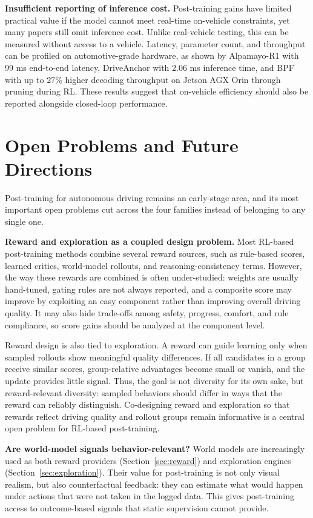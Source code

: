 \documentclass[runningheads]{llncs}
\begin{document}
\textbf{Insufficient reporting of inference cost.} Post-training gains have limited practical value if the model cannot meet real-time on-vehicle constraints, yet many papers still omit inference cost. Unlike real-vehicle testing, this can be measured without access to a vehicle. Latency, parameter count, and throughput can be profiled on automotive-grade hardware, as shown by Alpamayo-R1 with 99 ms end-to-end latency, DriveAnchor with 2.06 ms inference time, and BPF~\cite{bpf2026} with up to 27\% higher decoding throughput on Jetson AGX Orin through pruning during RL. These results suggest that on-vehicle efficiency should also be reported alongside closed-loop performance.



\section{Open Problems and Future Directions}
\label{sec:future}

Post-training for autonomous driving remains an early-stage area, and its most important open problems cut across the four families instead of belonging to any single one.

\textbf{Reward and exploration as a coupled design problem.} 
Most RL-based post-training methods combine several reward sources, such as rule-based scores, learned critics, world-model rollouts, and reasoning-consistency terms. However, the way these rewards are combined is often under-studied: weights are usually hand-tuned, gating rules are not always reported, and a composite score may improve by exploiting an easy component rather than improving overall driving quality. It may also hide trade-offs among safety, progress, comfort, and rule compliance, so score gains should be analyzed at the component level. 

Reward design is also tied to exploration. A reward can guide learning only when sampled rollouts show meaningful quality differences. If all candidates in a group receive similar scores, group-relative advantages become small or vanish, and the update provides little signal. Thus, the goal is not diversity for its own sake, but reward-relevant diversity: sampled behaviors should differ in ways that the reward can reliably distinguish. Co-designing reward and exploration so that rewards reflect driving quality and rollout groups remain informative is a central open problem for RL-based post-training.

\textbf{Are world-model signals behavior-relevant?}
World models are increasingly used as both reward providers (Section~\ref{sec:reward}) and exploration engines (Section~\ref{sec:exploration}). Their value for post-training is not only visual realism, but also counterfactual feedback: they can estimate what would happen under actions that were not taken in the logged data. This gives post-training access to outcome-based signals that static supervision cannot provide.
\end{document}
